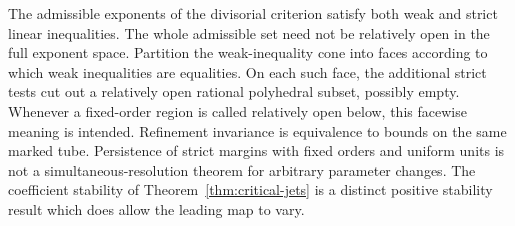 \begin{remark}\label{rem:order-faces}
The admissible exponents of the divisorial criterion satisfy both weak and strict linear inequalities. The whole admissible set need not be relatively open in the full exponent space. Partition the weak-inequality cone into faces according to which weak inequalities are equalities. On each such face, the additional strict tests cut out a relatively open rational polyhedral subset, possibly empty. Whenever a fixed-order region is called relatively open below, this facewise meaning is intended. Refinement invariance is equivalence to bounds on the same marked tube. Persistence of strict margins with fixed orders and uniform units is not a simultaneous-resolution theorem for arbitrary parameter changes. The coefficient stability of Theorem~\ref{thm:critical-jets} is a distinct positive stability result which does allow the leading map to vary.
\end{remark}
